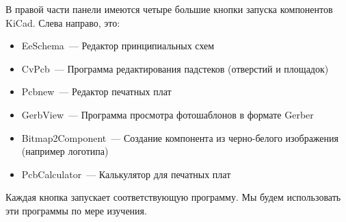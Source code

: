 В правой части панели имеются четыре большие кнопки запуска компонентов KiCad.
Слева направо, это:

\begin{itemize}
\item EeSchema\ --- Редактор принципиальных схем
\item CvPcb\ --- Программа редактирования падстеков (отверстий и площадок)
\item Pcbnew\ --- Редактор печатных плат
\item GerbView\ --- Программа просмотра фотошаблонов в формате Gerber
\item Bitmap2Component\ --- Создание компонента из черно-белого изображения
(например логотипа)
\item PcbCalculator\ --- Калькулятор для печатных плат
\end{itemize}

Каждая кнопка запускает соответствующую программу. Мы будем использовать эти
программы по мере изучения.



\secup